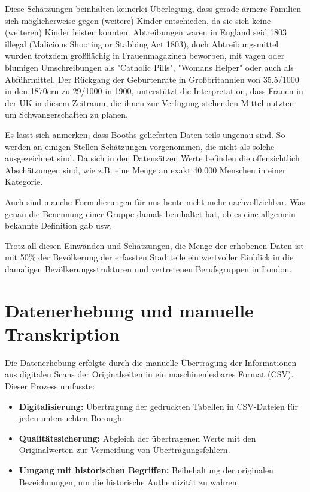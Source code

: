 Diese Schätzungen beinhalten keinerlei Überlegung, dass gerade ärmere Familien sich möglicherweise gegen (weitere) Kinder entschieden, da sie sich keine (weiteren) Kinder leisten konnten.
Abtreibungen waren in England seid 1803 illegal (Malicious Shooting or Stabbing Act 1803), doch Abtreibungsmittel wurden trotzdem großflächig in Frauenmagazinen beworben, mit vagen oder blumigen Umschreibungen als "Catholic Pills", "Womans Helper" oder auch als Abführmittel. Der Rückgang der Geburtenrate in Großbritannien von 35.5/1000 in den 1870ern zu 29/1000 in 1900, unterstützt die Interpretation, dass Frauen in der UK in diesem Zeitraum, die ihnen zur Verfügung stehenden Mittel nutzten um Schwangerschaften zu planen.

Es lässt sich anmerken, dass Booths gelieferten Daten teils ungenau sind. So werden an einigen Stellen Schätzungen vorgenommen, die nicht als solche ausgezeichnet sind. Da sich in den Datensätzen Werte befinden die offensichtlich Abschätzungen sind, wie z.B. eine Menge an exakt 40.000 Menschen in einer Kategorie.

Auch sind manche Formulierungen für uns heute nicht mehr nachvollziehbar. Was genau die Benennung einer Gruppe damals beinhaltet hat, ob es eine allgemein bekannte Definition gab usw.

Trotz all diesen Einwänden und Schätzungen, die Menge der erhobenen Daten ist mit 50\% der Bevölkerung der erfassten Stadtteile ein wertvoller Einblick in die damaligen Bevölkerungsstrukturen und vertretenen Berufsgruppen in London.

\section*{Datenerhebung und manuelle Transkription}
Die Datenerhebung erfolgte durch die manuelle Übertragung der Informationen aus digitalen Scans der Originalseiten in ein maschinenlesbares Format (CSV). Dieser Prozess umfasste:
\begin{itemize}
    \item \textbf{Digitalisierung:} Übertragung der gedruckten Tabellen in CSV-Dateien für jeden untersuchten Borough.
    \item \textbf{Qualitätssicherung:} Abgleich der übertragenen Werte mit den Originalwerten zur Vermeidung von Übertragungsfehlern.
    \item \textbf{Umgang mit historischen Begriffen:} Beibehaltung der originalen Bezeichnungen, um die historische Authentizität zu wahren.
\end{itemize}


